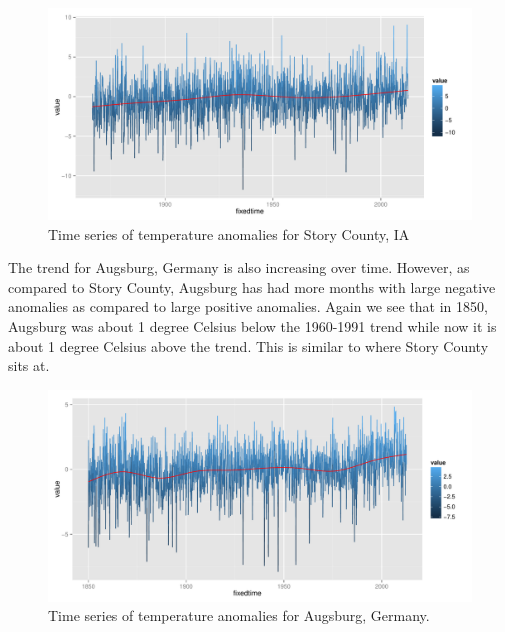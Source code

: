 \documentclass{article}\usepackage{graphicx, color}
\newenvironment{knitrout}{}{} %
\begin{document}
\begin{figure}[H]
\begin{knitrout}
\color{fgcolor}\includegraphics[width=\linewidth]{figure/story-trend} 
\end{knitrout}

\caption{\label{storycount}Time series of temperature anomalies for Story County, IA}
\end{figure}

The trend for Augsburg, Germany is also increasing over time. However, as compared to Story County, Augsburg has had more months with large negative anomalies as compared to large positive anomalies. Again we see that in 1850, Augsburg was about 1 degree Celsius below the 1960-1991 trend while now it is about 1 degree Celsius above the trend. This is similar to where Story County sits at.
\begin{figure}[H]
\begin{knitrout}
\color{fgcolor}\includegraphics[width=\linewidth]{figure/augsburg-trend} 
\end{knitrout}

\caption{\label{augsburg}Time series of temperature anomalies for Augsburg, Germany.}
\end{figure}
\end{document}
